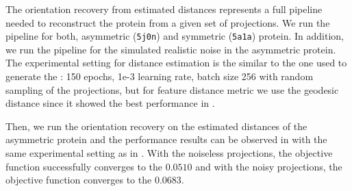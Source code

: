 
The orientation recovery from estimated distances represents a full pipeline needed to reconstruct the protein from a given set of projections.
We run the pipeline for both, asymmetric (\texttt{5j0n}) and symmetric (\texttt{5a1a}) protein.
In addition, we run the pipeline for the simulated realistic noise in the asymmetric protein.
The experimental setting for distance estimation is the similar to the one used to generate the : 150 epochs, 1e-3 learning rate, batch size 256 with random sampling of the projections, but for feature distance metric we use the geodesic distance since it showed the best performance in .

Then, we run the orientation recovery on the estimated distances of the asymmetric protein and the performance results can be observed in  with the same experimental setting as in .
With the noiseless projections, the objective function successfully converges to the $0.0510$ and with the noisy projections, the objective function converges to the $0.0683$.


